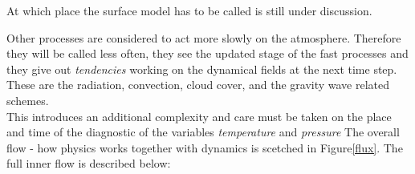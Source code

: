 At which place the surface model has to be called is still under discussion.

Other processes are considered to act more slowly on the atmosphere. Therefore they will be called less often, they see the updated stage of the fast processes and  they give out \emph{tendencies} working on the dynamical fields at the next time step. These are the radiation, convection, cloud cover, and the gravity wave related schemes.\\

This introduces an additional complexity and care must be taken on the place and time of the diagnostic of the variables \emph{temperature} and \emph{pressure}
The overall flow - how physics works together with dynamics is scetched in Figure{\ref{flux}}. The full inner flow is described below:

